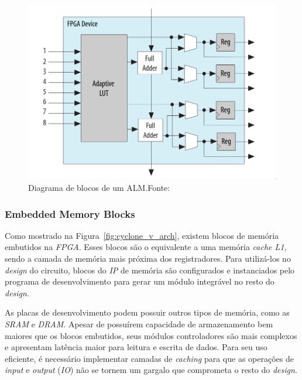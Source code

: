         \begin{figure}[H]
        \centering
        \includegraphics[width=.8\linewidth]
            {../images/intel_alm_high_level.png}
            \caption[Diagrama de blocos de um ALM]
                {Diagrama de blocos de um ALM.\quad Fonte:~\cite{cyclone_alm}}
            \label{fig:fpga_alm}
        \end{figure}


        \subsubsection{Embedded Memory Blocks}
        { Como mostrado na Figura~\ref{fig:cyclone_v_arch}, existem blocos de
            memória embutidos na \textit{FPGA}. Esses blocos são o equivalente
            a uma memória \textit{cache L1}, sendo a camada de memória mais próxima
            dos registradores. Para utilizá-los no \textit{design} do circuito,
            blocos do \textit{IP} de memória são configurados e instanciados
            pelo programa de desenvolvimento para gerar um módulo integrável no
            resto do \textit{design}.
        }

        { As placas de desenvolvimento podem possuir outros tipos de memória,
            como as \textit{SRAM} e \textit{DRAM}. Apesar de possuírem capacidade
            de armazenamento bem maiores que os blocos embutidos, seus
            módulos controladores são mais complexos e apresentam latência maior
            para leitura e escrita de dados. Para seu uso eficiente, é necessário
            implementar camadas de \textit{caching} para que as operações de
            \textit{input} e \textit{output} (\textit{IO}) não se tornem um
            gargalo que comprometa o resto do \textit{design}.
        }


